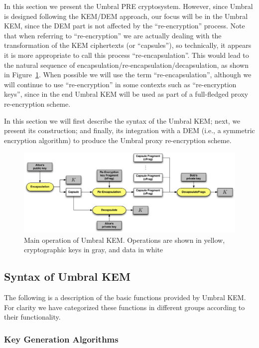 \documentclass{amsart}
\begin{document}
In this section we present the Umbral PRE cryptosystem. However, since Umbral is designed following the KEM/DEM approach, our focus will be in the Umbral KEM, since the DEM part is not affected by the ``re-encryption'' process. Note that when referring to ``re-encryption'' we are actually dealing with the transformation of the KEM ciphertexts (or ``capsules''), so technically, it appears it is more appropriate to call this process ``re-encapsulation''. This would lead to the natural sequence of encapsulation/re-encapsulation/decapsulation, as shown in Figure~\ref{fig:umbral-kem}. When possible we will use the term ``re-encapsulation'', although we will continue to use ``re-encryption'' in some contexts such as ``re-encryption keys'', since in the end Umbral KEM will be used as part of a full-fledged proxy re-encryption scheme. 

In this section we will first describe the syntax of the Umbral KEM; next, we present its construction; and finally, its integration with a DEM (i.e., a symmetric encryption algorithm) to produce the Umbral proxy re-encryption scheme. 

\begin{figure}%
\centering
\includegraphics[width=\textwidth]{figures/umbral-kem-flow.pdf}
\caption{Main operation of Umbral KEM. Operations are shown in yellow, cryptographic keys in gray, and data in white}
\label{fig:umbral-kem}
\end{figure}

\subsection{Syntax of Umbral KEM}

The following is a description of the basic functions provided by Umbral KEM. For clarity we have categorized these functions in different groups according to their functionality. 

\subsubsection{Key Generation Algorithms}
\end{document}
